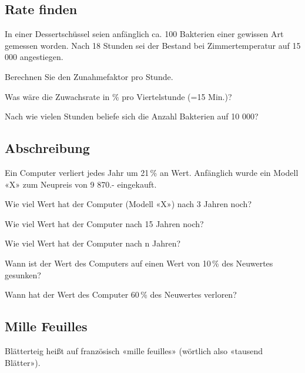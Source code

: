 \subsection{Rate finden}
In einer Dessertschüssel seien anfänglich ca. 100 Bakterien einer gewissen Art
gemessen worden. Nach 18 Stunden sei der Bestand bei Zimmertemperatur auf
15 000 angestiegen.

\begin{bbwAufgabenBlock}
\item Berechnen Sie den Zunahmefaktor pro Stunde. 
\item Was wäre die Zuwachsrate in \% pro Viertelstunde (=15 Min.)?
\item Nach wie vielen Stunden beliefe sich die Anzahl Bakterien auf 10 000?  
\end{bbwAufgabenBlock}

\platzFuerBerechnungenBisEndeSeite{}
\subsection{Abschreibung}
Ein Computer verliert jedes Jahr um 21\,\% an Wert. Anfänglich wurde ein Modell «X»
zum Neupreis von 9 870.- eingekauft.

\begin{bbwAufgabenBlock}
\item  Wie viel Wert hat der Computer (Modell «X») nach 3 Jahren
noch?  
\item Wie viel Wert hat der Computer nach 15 Jahren noch?  \noTRAINER{\seitenUmbruchImAufgabenteil{}}
\item Wie viel Wert hat der Computer nach n Jahren?   
\item Wann ist der Wert des Computers auf einen Wert von 10\,\% des
Neuwertes gesunken?  \noTRAINER{\seitenUmbruchImAufgabenteil{}}
\item Wann hat der Wert des Computer 60\,\% des Neuwertes
verloren?  
\end{bbwAufgabenBlock}

\platzFuerBerechnungenBisEndeSeite{}
\subsection{Mille Feuilles}
Blätterteig heißt auf französisch «mille feuilles» (wörtlich also
«tausend Blätter»).

